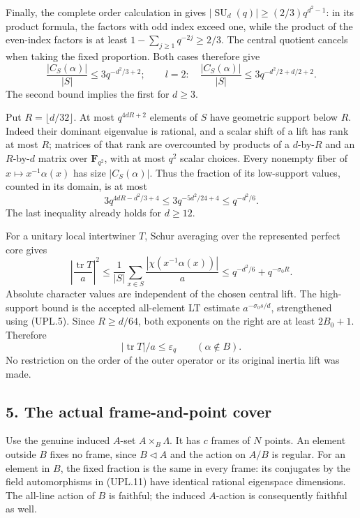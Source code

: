 Finally, the complete order calculation in
\cite[pp.~117--118]{OS:Taylor1992} gives
\(|\operatorname{SU}_d(q)|\ge(2/3)q^{d^2-1}\): in its product
formula, the factors with odd index exceed one, while the product
of the even-index factors is at least
\(1-\sum_{j\ge1}q^{-2j}\ge2/3\).
The central quotient cancels when taking the fixed proportion.
Both cases therefore give
\[
 \frac{|C_S(\alpha)|}{|S|}
   \le3q^{-d^2/3+2};\qquad
 l=2:\quad \frac{|C_S(\alpha)|}{|S|}
   \le3q^{-d^2/2+d/2+2}.
 \tag{UPL.12}
\]
The second bound implies the first for \(d\ge3\).

Put \(R=\lfloor d/32\rfloor\). At most
\(q^{4dR+2}\) elements of \(S\) have geometric support below
\(R\). Indeed their dominant eigenvalue is rational, and a scalar
shift of a lift has rank at most \(R\); matrices of that rank are
overcounted by products of a \(d\)-by-\(R\) and an
\(R\)-by-\(d\) matrix over \(\mathbf F_{q^2}\), with at most
\(q^2\) scalar choices. Every nonempty fiber of
\(x\mapsto x^{-1}\alpha(x)\) has size \(|C_S(\alpha)|\).
Thus the fraction of its low-support values, counted in its domain,
is at most
\[
        3q^{4dR-d^2/3+4}
             \le3q^{-5d^2/24+4}\le q^{-d^2/6}.
 \tag{UPL.13}
\]
The last inequality already holds for \(d\ge12\).

For a unitary local intertwiner \(T\), Schur averaging over the
represented perfect core gives
\[
 \left|\frac{\operatorname{tr}T}{a}\right|^2
 \le\frac1{|S|}\sum_{x\in S}
       \frac{|\chi(x^{-1}\alpha(x))|}{a}
 \le q^{-d^2/6}+q^{-\sigma_0R}.
 \tag{UPL.14}
\]
Absolute character values are independent of the chosen central
lift. The high-support bound is the accepted all-element LT estimate
\(a^{-\sigma_0s/d}\), strengthened using (UPL.5).
Since \(R\ge d/64\), both exponents on the right are at least
\(2B_0+1\). Therefore
\[
                         |\operatorname{tr}T|/a\le\varepsilon_q
                              \qquad(\alpha\notin B).
 \tag{UPL.15}
\]
No restriction on the order of the outer operator or its original
inertia lift was made.

\subsection*{5. The actual frame-and-point cover}

Use the genuine induced \(A\)-set
\(A\times_B\Lambda\). It has \(c\) frames of \(N\) points.
An element outside \(B\) fixes no frame, since \(B\triangleleft A\)
and the action on \(A/B\) is regular. For an element in \(B\),
the fixed fraction is the same in every frame: its conjugates by
the field automorphisms in (UPL.11) have identical rational
eigenspace dimensions. The all-line action of \(B\) is faithful;
the induced \(A\)-action is consequently faithful as well.

